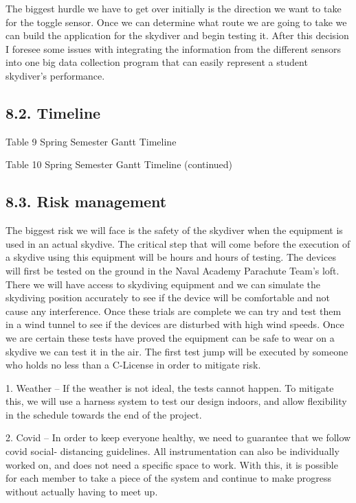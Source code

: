 \documentclass[10pt]{article}
\begin{document}
The biggest hurdle we have to get over initially is the direction we want to take for the toggle sensor. Once we can determine what route we are going to take we can build the application for the skydiver and begin testing it. After this decision I foresee some issues with integrating the information from the different sensors into one big data collection program that can easily represent a student skydiver’s performance.

\subsection{8.2. Timeline}

Table 9 Spring Semester Gantt Timeline

Table 10 Spring Semester Gantt Timeline (continued)

\subsection{8.3. Risk management}
The biggest risk we will face is the safety of the skydiver when the equipment is used in an actual skydive. The critical step that will come before the execution of a skydive using this equipment will be hours and hours of testing. The devices will first be tested on the ground in the Naval Academy Parachute Team’s loft. There we will have access to skydiving equipment and we can simulate the skydiving position accurately to see if the device will be comfortable and not cause any interference. Once these trials are complete we can try and test them in a wind tunnel to see if the devices are disturbed with high wind speeds. Once we are certain these tests have proved the equipment can be safe to wear on a skydive we can test it in the air. The first test jump will be executed by someone who holds no less than a C-License in order to mitigate risk.

1. Weather -- If the weather is not ideal, the tests cannot happen. To mitigate this, we will use a harness system to test our design indoors, and allow flexibility in the schedule towards the end of the project.

2. Covid -- In order to keep everyone healthy, we need to guarantee that we follow covid social- distancing guidelines. All instrumentation can also be individually worked on, and does not need a specific space to work. With this, it is possible for each member to take a piece of the system and continue to make progress without actually having to meet up.
\end{document}
